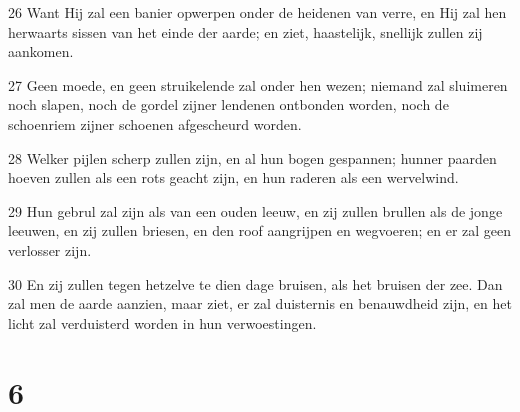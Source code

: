 \par 26 Want Hij zal een banier opwerpen onder de heidenen van verre, en Hij zal hen herwaarts sissen van het einde der aarde; en ziet, haastelijk, snellijk zullen zij aankomen.
\par 27 Geen moede, en geen struikelende zal onder hen wezen; niemand zal sluimeren noch slapen, noch de gordel zijner lendenen ontbonden worden, noch de schoenriem zijner schoenen afgescheurd worden.
\par 28 Welker pijlen scherp zullen zijn, en al hun bogen gespannen; hunner paarden hoeven zullen als een rots geacht zijn, en hun raderen als een wervelwind.
\par 29 Hun gebrul zal zijn als van een ouden leeuw, en zij zullen brullen als de jonge leeuwen, en zij zullen briesen, en den roof aangrijpen en wegvoeren; en er zal geen verlosser zijn.
\par 30 En zij zullen tegen hetzelve te dien dage bruisen, als het bruisen der zee. Dan zal men de aarde aanzien, maar ziet, er zal duisternis en benauwdheid zijn, en het licht zal verduisterd worden in hun verwoestingen.

\chapter{6}

